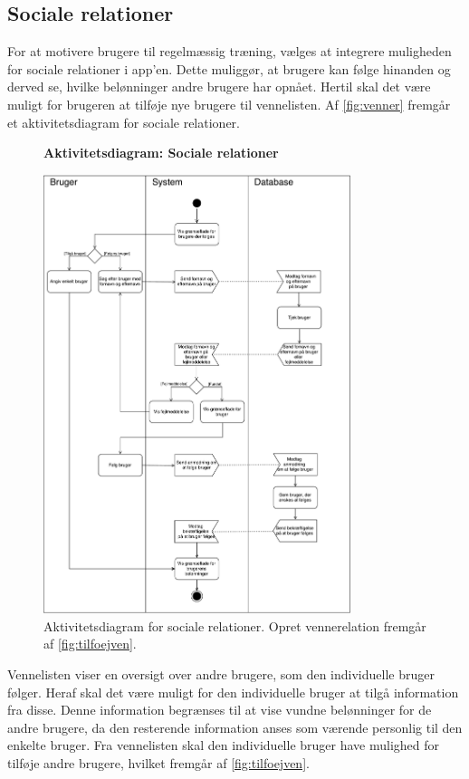 \subsection*{Sociale relationer} 
For at motivere brugere til regelmæssig træning, vælges at integrere muligheden for sociale relationer i app'en. Dette muliggør, at brugere kan følge hinanden og derved se, hvilke belønninger andre brugere har opnået. Hertil skal det være muligt for brugeren at tilføje nye brugere til vennelisten. 
Af \autoref{fig:venner} fremgår et aktivitetsdiagram for sociale relationer. 

\begin{figure} [H]
\centering
\textbf{Aktivitetsdiagram: Sociale relationer}\par\medskip
\includegraphics[width=0.8\textwidth]{figures/aktivitetsdiagram/venner}
\caption{Aktivitetsdiagram for sociale relationer. Opret vennerelation fremgår af \autoref{fig:tilfoejven}.}
\label{fig:venner}
\end{figure}

\noindent
Vennelisten viser en oversigt over andre brugere, som den individuelle bruger følger. Heraf skal det være muligt for den individuelle bruger at tilgå information fra disse. Denne information begrænses til at vise vundne belønninger for de andre brugere, da den resterende information anses som værende personlig til den enkelte bruger. 
Fra vennelisten skal den individuelle bruger have mulighed for tilføje andre brugere, hvilket fremgår af \autoref{fig:tilfoejven}.  

